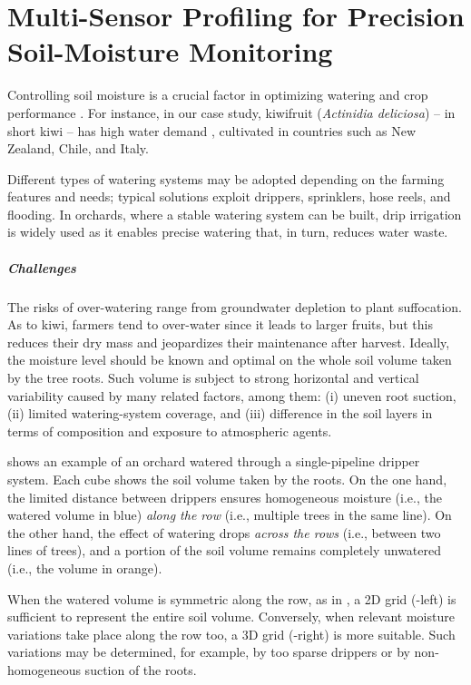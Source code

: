 
\chapter{Multi-Sensor Profiling for Precision Soil-Moisture Monitoring}
\label{physics-aware-chap:pluto}

Controlling soil moisture is a crucial factor in optimizing watering and crop performance \cite{turkeltaub2016real}.
For instance, in our case study, kiwifruit (\emph{Actinidia deliciosa}) -- in short kiwi -- has high water demand \cite{judd1986water}, cultivated in countries such as New Zealand, Chile, and Italy.

Different types of watering systems may be adopted depending on the farming features and needs; typical solutions exploit drippers, sprinklers, hose reels, and flooding.
In orchards, where a stable watering system can be built, drip irrigation is widely used as it enables precise watering that, in turn, reduces water waste.

\paragraph{Challenges}
The risks of over-watering range from groundwater depletion to plant suffocation.
As to kiwi, farmers tend to over-water since it leads to larger fruits, but this reduces their dry mass and jeopardizes their maintenance after harvest.
Ideally, the moisture level should be known and optimal on the whole soil volume taken by the tree roots.
Such volume is subject to strong horizontal and vertical variability caused by many related factors, among them: (i) uneven root suction, (ii) limited watering-system coverage, and (iii) difference in the soil layers in terms of composition and exposure to atmospheric agents. %

 shows an example of an orchard watered through a single-pipeline dripper system.
Each cube shows the soil volume taken by the roots.
On the one hand, the limited distance between drippers ensures homogeneous moisture (i.e., the watered volume in blue) \textit{along the row} (i.e., multiple trees in the same line).
On the other hand, the effect of watering drops \textit{across the rows} (i.e., between two lines of trees), and a portion of the soil volume remains completely unwatered (i.e., the volume in orange).

When the watered volume is symmetric along the row, as in , a 2D grid (-left) is sufficient to represent the entire soil volume. Conversely, when relevant moisture variations take place along the row too, a 3D grid (-right) is more suitable. Such variations may be determined, for example, by too sparse drippers or by non-homogeneous suction of the roots.

